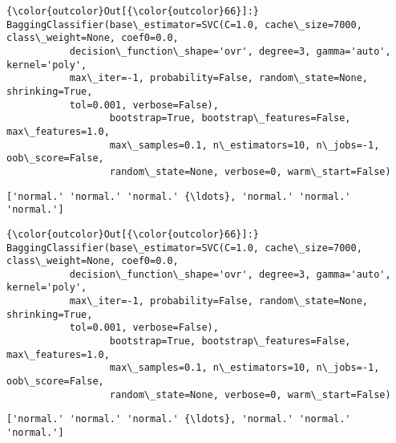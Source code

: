 \documentclass[11pt]{article}
\begin{document}
\begin{Verbatim}[commandchars=\\\{\}]
{\color{outcolor}Out[{\color{outcolor}66}]:} BaggingClassifier(base\_estimator=SVC(C=1.0, cache\_size=7000, class\_weight=None, coef0=0.0,
           decision\_function\_shape='ovr', degree=3, gamma='auto', kernel='poly',
           max\_iter=-1, probability=False, random\_state=None, shrinking=True,
           tol=0.001, verbose=False),
                  bootstrap=True, bootstrap\_features=False, max\_features=1.0,
                  max\_samples=0.1, n\_estimators=10, n\_jobs=-1, oob\_score=False,
                  random\_state=None, verbose=0, warm\_start=False)
\end{Verbatim}
            
    \begin{Verbatim}[commandchars=\\\{\}]
['normal.' 'normal.' 'normal.' {\ldots}, 'normal.' 'normal.' 'normal.']

    \end{Verbatim}

\begin{Verbatim}[commandchars=\\\{\}]
{\color{outcolor}Out[{\color{outcolor}66}]:} BaggingClassifier(base\_estimator=SVC(C=1.0, cache\_size=7000, class\_weight=None, coef0=0.0,
           decision\_function\_shape='ovr', degree=3, gamma='auto', kernel='poly',
           max\_iter=-1, probability=False, random\_state=None, shrinking=True,
           tol=0.001, verbose=False),
                  bootstrap=True, bootstrap\_features=False, max\_features=1.0,
                  max\_samples=0.1, n\_estimators=10, n\_jobs=-1, oob\_score=False,
                  random\_state=None, verbose=0, warm\_start=False)
\end{Verbatim}
            
    \begin{Verbatim}[commandchars=\\\{\}]
['normal.' 'normal.' 'normal.' {\ldots}, 'normal.' 'normal.' 'normal.']

    \end{Verbatim}
\end{document}
